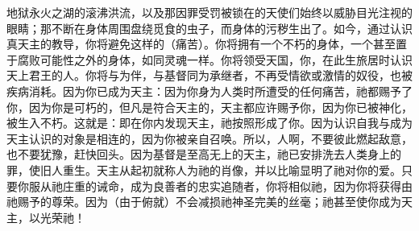 地狱永火之湖的滚沸洪流，以及那因罪受罚被锁在的天使们始终以威胁目光注视的眼睛；那不断在身体周围盘绕觅食的虫子，而身体的污秽生出了。如今，通过认识真天主的教导，你将避免这样的（痛苦）。你将拥有一个不朽的身体，一个甚至置于腐败可能性之外的身体，如同灵魂一样。你将领受天国，你，在此生旅居时认识天上君王的人。你将与为伴，与基督同为承继者，不再受情欲或激情的奴役，也被疾病消耗。因为你已成为天主：因为你身为人类时所遭受的任何痛苦，祂都赐予了你，因为你是可朽的，但凡是符合天主的，天主都应许赐予你，因为你已被神化，被生入不朽。这就是：即在你内发现天主，祂按照形成了你。因为认识自我与成为天主认识的对象是相连的，因为你被亲自召唤。所以，人啊，不要彼此燃起敌意，也不要犹豫，赶快回头。因为基督是至高无上的天主，祂已安排洗去人类身上的罪，使旧人重生。天主从起初就称人为祂的肖像，并以比喻显明了祂对你的爱。只要你服从祂庄重的诫命，成为良善者的忠实追随者，你将相似祂，因为你将获得由祂赐予的尊荣。因为（由于俯就）不会减损祂神圣完美的丝毫；祂甚至使你成为天主，以光荣祂！\par

